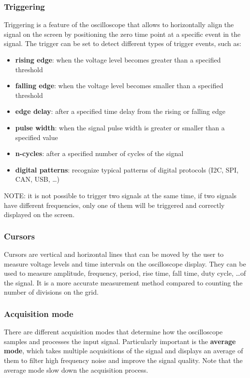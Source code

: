 \subsubsection*{Triggering}
Triggering is a feature of the oscilloscope that allows to horizontally align the signal on the screen by positioning the zero time
point at a specific event in the signal. The trigger can be set to detect different types of trigger events, such as:
\begin{itemize}
	\item \textbf{rising edge}: when the voltage level becomes greater than a specified threshold
	\item \textbf{falling edge}: when the voltage level becomes smaller than a specified threshold
	\item \textbf{edge delay}: after a specified time delay from the rising or falling edge
	\item \textbf{pulse width}: when the signal pulse width is greater or smaller than a specified value
	\item \textbf{n-cycles}: after a specified number of cycles of the signal
	\item \textbf{digital patterns}: recognize typical patterns of  digital protocols (I2C, SPI, CAN, USB, \dots)
\end{itemize}
NOTE: it is not possible to trigger two signals at the same time, if two signals have different frequencies, only one of them will
be triggered and correctly displayed on the screen.

\subsubsection*{Cursors}
Cursors are vertical and horizontal lines that can be moved by the user to measure voltage levels and time intervals on the
oscilloscope display. They can be used to measure amplitude, frequency, period, rise time, fall time, duty cycle, \dots of
the signal. It is a more accurate measurement method compared to counting the number of divisions on the grid.

\subsubsection*{Acquisition mode}
There are different acquisition modes that determine how the oscilloscope samples and processes the input signal. Particularly
important is the \textbf{average mode}, which takes multiple acquisitions of the signal and displays an average of them to filter
high frequency noise and improve the signal quality. Note that the average mode slow down the acquisition process.

